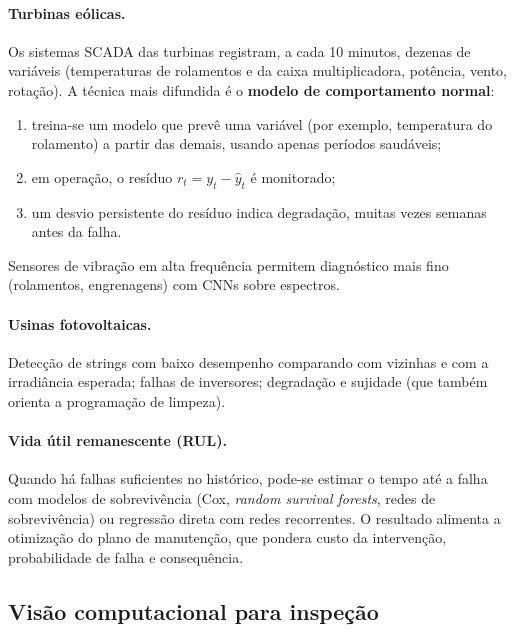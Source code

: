 \documentclass[10pt,a4paper,oneside]{article}
\begin{document}
\paragraph{Turbinas eólicas.} Os sistemas SCADA das turbinas registram, a cada
10 minutos, dezenas de variáveis (temperaturas de rolamentos e da caixa
multiplicadora, potência, vento, rotação). A técnica mais difundida é o
\textbf{modelo de comportamento normal}:
\begin{enumerate}
  \item treina-se um modelo que prevê uma variável (por exemplo, temperatura
    do rolamento) a partir das demais, usando apenas períodos saudáveis;
  \item em operação, o resíduo $r_t = y_t - \hat{y}_t$ é monitorado;
  \item um desvio persistente do resíduo indica degradação, muitas vezes
    semanas antes da falha.
\end{enumerate}
Sensores de vibração em alta frequência permitem diagnóstico mais fino
(rolamentos, engrenagens) com CNNs sobre espectros.

\paragraph{Usinas fotovoltaicas.} Detecção de strings com baixo desempenho
comparando com vizinhas e com a irradiância esperada; falhas de inversores;
degradação e sujidade (que também orienta a programação de limpeza).

\paragraph{Vida útil remanescente (RUL).} Quando há falhas suficientes no
histórico, pode-se estimar o tempo até a falha com modelos de sobrevivência
(Cox, \textit{random survival forests}, redes de sobrevivência) ou regressão
direta com redes recorrentes. O resultado alimenta a otimização do plano de
manutenção, que pondera custo da intervenção, probabilidade de falha e
consequência.

\subsection{Visão computacional para inspeção}
\end{document}
